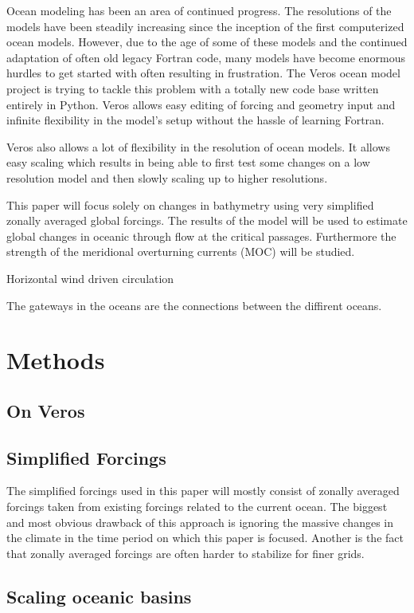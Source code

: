 \documentclass[a4paper]{article}
\begin{document}
\begin{multicols}{2}
Ocean modeling has been an area of continued progress. The resolutions of the models have been steadily increasing since the inception of the first computerized ocean models. However, due to the age of some of these models and the continued adaptation of often old legacy Fortran code, many models have become enormous hurdles to get started with often resulting in frustration. The Veros\cite{Hafner2018Aug} ocean model project is trying to tackle this problem with a totally new code base written entirely in Python. Veros allows easy editing of forcing and geometry input and infinite flexibility in the model's setup without the hassle of learning Fortran.

Veros also allows a lot of flexibility in the resolution of ocean models. It allows easy scaling which results in being able to first test some changes on a low resolution model and then slowly scaling up to higher resolutions.

This paper will focus solely on changes in bathymetry using very simplified zonally averaged global forcings. The results of the model will be used to estimate global changes in oceanic through flow at the critical passages. Furthermore the strength of the meridional overturning currents (MOC) will be studied.

Horizontal wind driven circulation

The gateways in the oceans are the connections between the diffirent oceans. 


\section{Methods}
\subsection{On Veros}
\subsection{Simplified Forcings}
The simplified forcings used in this paper will mostly consist of zonally averaged forcings taken from existing forcings related to the current ocean. The biggest and most obvious drawback of this approach is ignoring the massive changes in the climate in the time period on which this paper is focused. Another is the fact that zonally averaged forcings are often harder to stabilize for finer grids.


\subsection{Scaling oceanic basins}

\end{multicols}
\end{document}
